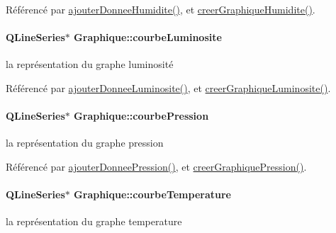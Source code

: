 Référencé par \hyperlink{class_graphique_ad3dd36f05a9923054a0a2138f96f0311}{ajouter\+Donnee\+Humidite()}, et \hyperlink{class_graphique_a19d6deef2d11e95093a343d49f75d14e}{creer\+Graphique\+Humidite()}.

\paragraph[{\texorpdfstring{courbe\+Luminosite}{courbeLuminosite}}]{\setlength{\rightskip}{0pt plus 5cm}Q\+Line\+Series$\ast$ Graphique\+::courbe\+Luminosite\hspace{0.3cm}{\ttfamily [private]}}\hypertarget{class_graphique_a8bf527363f5d8198bf6fc959a8689963}{}\label{class_graphique_a8bf527363f5d8198bf6fc959a8689963}
la représentation du graphe luminosité 

Référencé par \hyperlink{class_graphique_a1af0e1968998cb7b5ee8add1197cb0e0}{ajouter\+Donnee\+Luminosite()}, et \hyperlink{class_graphique_a3b55b9c4732856e1b25bef167c25ac4c}{creer\+Graphique\+Luminosite()}.

\paragraph[{\texorpdfstring{courbe\+Pression}{courbePression}}]{\setlength{\rightskip}{0pt plus 5cm}Q\+Line\+Series$\ast$ Graphique\+::courbe\+Pression\hspace{0.3cm}{\ttfamily [private]}}\hypertarget{class_graphique_a49e03fd868685d638fc285837ca26772}{}\label{class_graphique_a49e03fd868685d638fc285837ca26772}
la représentation du graphe pression 

Référencé par \hyperlink{class_graphique_a289f0631e56465012511fd7ec9da1b23}{ajouter\+Donnee\+Pression()}, et \hyperlink{class_graphique_adc50b5ae7a54dd576c99e74ec6bf74c5}{creer\+Graphique\+Pression()}.

\paragraph[{\texorpdfstring{courbe\+Temperature}{courbeTemperature}}]{\setlength{\rightskip}{0pt plus 5cm}Q\+Line\+Series$\ast$ Graphique\+::courbe\+Temperature\hspace{0.3cm}{\ttfamily [private]}}\hypertarget{class_graphique_a6c2f8ef3364123ad300de74db529bd9b}{}\label{class_graphique_a6c2f8ef3364123ad300de74db529bd9b}
la représentation du graphe temperature 

